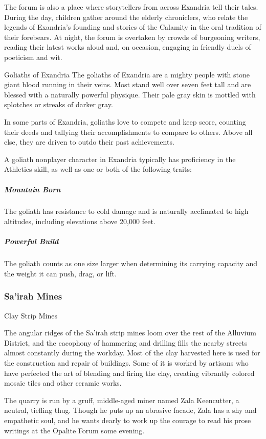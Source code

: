 \documentclass[10pt,a4paper,twoside,bg=print,twocolumn,openany,nodeprecatedcode]{dndbook}
\begin{document}
The forum is also a place where storytellers from across Exandria tell their tales. During the day, children gather around the elderly chroniclers, who relate the legends of Exandria's founding and stories of the Calamity in the oral tradition of their forebears. At night, the forum is overtaken by crowds of burgeoning writers, reading their latest works aloud and, on occasion, engaging in friendly duels of poeticism and wit.


  
\begin{DndSidebar}[float=!b]{Goliaths of Exandria}
The goliaths of Exandria are a mighty people with stone giant blood running in their veins. Most stand well over seven feet tall and are blessed with a naturally powerful physique. Their pale gray skin is mottled with splotches or streaks of darker gray.

In some parts of Exandria, goliaths love to compete and keep score, counting their deeds and tallying their accomplishments to compare to others. Above all else, they are driven to outdo their past achievements.

A goliath nonplayer character in Exandria typically has proficiency in the Athletics skill, as well as one or both of the following traits:

\subparagraph{Mountain Born}
The goliath has resistance to cold damage and is naturally acclimated to high altitudes, including elevations above 20,000 feet.

\subparagraph{Powerful Build}
The goliath counts as one size larger when determining its carrying capacity and the weight it can push, drag, or lift.

\end{DndSidebar}

\subsubsection{Sa'irah Mines}
Clay Strip Mines

The angular ridges of the Sa'irah strip mines loom over the rest of the Alluvium District, and the cacophony of hammering and drilling fills the nearby streets almost constantly during the workday. Most of the clay harvested here is used for the construction and repair of buildings. Some of it is worked by artisans who have perfected the art of blending and firing the clay, creating vibrantly colored mosaic tiles and other ceramic works.

The quarry is run by a gruff, middle-aged miner named Zala Keencutter, a neutral, tiefling thug. Though he puts up an abrasive facade, Zala has a shy and empathetic soul, and he wants dearly to work up the courage to read his prose writings at the Opalite Forum some evening.
\end{document}
